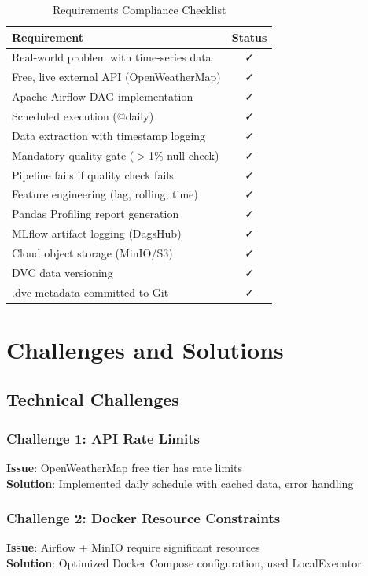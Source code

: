 \documentclass[12pt,a4paper]{article}
\begin{document}
\begin{table}[H]
\centering
\begin{tabular}{|p{8cm}|c|}
\hline
\textbf{Requirement} & \textbf{Status} \\
\hline
Real-world problem with time-series data & ✓ \\
Free, live external API (OpenWeatherMap) & ✓ \\
Apache Airflow DAG implementation & ✓ \\
Scheduled execution (@daily) & ✓ \\
Data extraction with timestamp logging & ✓ \\
Mandatory quality gate ($>$1\% null check) & ✓ \\
Pipeline fails if quality check fails & ✓ \\
Feature engineering (lag, rolling, time) & ✓ \\
Pandas Profiling report generation & ✓ \\
MLflow artifact logging (DagsHub) & ✓ \\
Cloud object storage (MinIO/S3) & ✓ \\
DVC data versioning & ✓ \\
.dvc metadata committed to Git & ✓ \\
\hline
\end{tabular}
\caption{Requirements Compliance Checklist}
\label{tab:compliance}
\end{table}

\section{Challenges and Solutions}

\subsection{Technical Challenges}

\subsubsection{Challenge 1: API Rate Limits}
\textbf{Issue}: OpenWeatherMap free tier has rate limits \\
\textbf{Solution}: Implemented daily schedule with cached data, error handling

\subsubsection{Challenge 2: Docker Resource Constraints}
\textbf{Issue}: Airflow + MinIO require significant resources \\
\textbf{Solution}: Optimized Docker Compose configuration, used LocalExecutor
\end{document}
